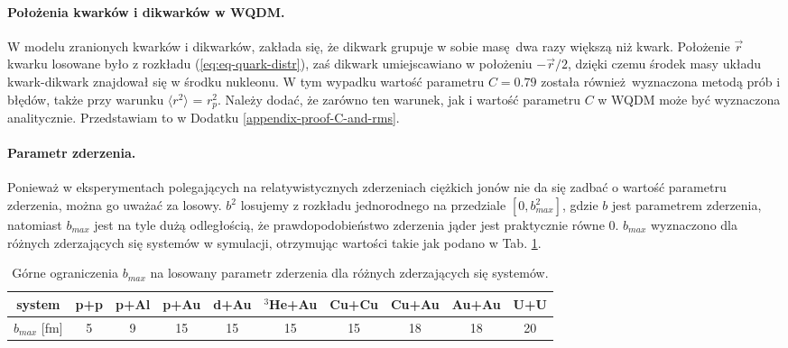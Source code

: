 \documentclass[a4paper,12pt]{article}
\begin{document}
\paragraph{Położenia kwarków i dikwarków w WQDM.}
W modelu zranionych kwarków i dikwarków, zakłada się, że dikwark grupuje w sobie masę dwa razy większą niż kwark. Położenie $\vec{r}$ kwarku losowane było z rozkładu (\ref{eq:eq-quark-distr}), zaś dikwark umiejscawiano w położeniu $-\vec{r}/2$, dzięki czemu środek masy układu kwark-dikwark znajdował się w środku nukleonu. W tym wypadku wartość parametru $C=0.79$ została również wyznaczona metodą prób i błędów, także przy warunku $\langle r^2 \rangle$  = $r_p^2$. Należy dodać, że zarówno ten warunek, jak i wartość parametru $C$ w WQDM może być wyznaczona analitycznie. Przedstawiam to w Dodatku \ref{appendix-proof-C-and-rms}.

\paragraph{Parametr zderzenia.}
Ponieważ w eksperymentach polegających na relatywistycznych zderzeniach ciężkich jonów nie da się zadbać o wartość parametru zderzenia, można go uważać za losowy. $b^2$ losujemy z rozkładu jednorodnego na przedziale $[0, b_{max}^2]$, gdzie $b$ jest parametrem zderzenia, natomiast $b_{max}$ jest na tyle dużą odległością, że prawdopodobieństwo zderzenia jąder jest praktycznie równe 0. $b_{max}$ wyznaczono dla różnych zderzających się systemów w symulacji, otrzymując wartości takie jak podano w Tab. \ref{table:b-max}.

\begin{table}[h!]
\begin{center}
\begin{tabular}{|c|c|c|c|c|c|c|c|c|c|} \hline
system & p+p & p+Al & p+Au & d+Au & $^3$He+Au & Cu+Cu & Cu+Au & Au+Au & U+U \\ \hline
$b_{max}$ [fm] & 5 & 9 & 15 & 15 & 15 & 15 & 18 & 18 & 20  \\ \hline
\end{tabular}
\caption{\label{table:b-max} 
Górne ograniczenia $b_{max}$ na losowany parametr zderzenia dla różnych zderzających się systemów.}
\end{center}
\end{table}
\end{document}
